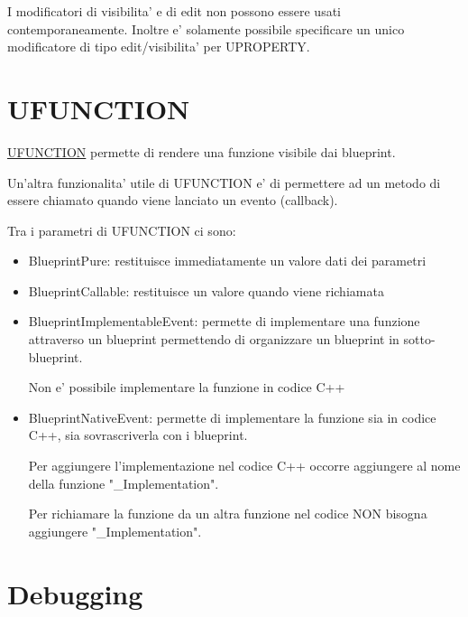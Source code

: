         \begin{warningbox}
            I modificatori di visibilita' e di edit non possono essere usati contemporaneamente. Inoltre e' solamente possibile specificare un unico modificatore di tipo edit/visibilita' per UPROPERTY.
        \end{warningbox}


    \section{UFUNCTION}
        \href{https://docs.unrealengine.com/5.0/en-US/ufunctions-in-unreal-engine/}{UFUNCTION} permette di rendere una funzione visibile dai blueprint.

        Un'altra funzionalita' utile di UFUNCTION e' di permettere ad un metodo di essere chiamato quando viene lanciato un evento (callback).

        Tra i parametri di UFUNCTION ci sono:
        \begin{itemize}
            \item BlueprintPure: restituisce immediatamente un valore dati dei parametri
            \item BlueprintCallable: restituisce un valore quando viene richiamata
            \item BlueprintImplementableEvent: permette di implementare una funzione attraverso un blueprint permettendo di organizzare un blueprint in sotto-blueprint.

                \begin{notebox}
                    Non e' possibile implementare la funzione  in codice C++
                \end{notebox}

            \item BlueprintNativeEvent: permette di implementare la funzione sia in codice C++, sia sovrascriverla con i blueprint.

                Per aggiungere l'implementazione nel codice C++ occorre aggiungere al nome della funzione "\_Implementation".

                \begin{notebox}
                    Per richiamare la funzione da un altra funzione nel codice NON bisogna aggiungere "\_Implementation".
                \end{notebox}
        \end{itemize}


    \section{Debugging}

